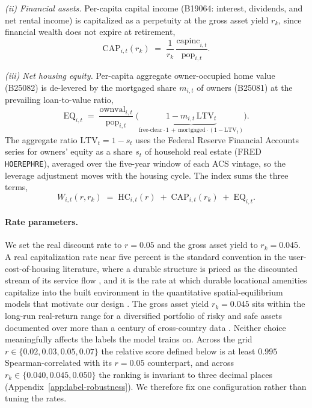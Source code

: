 \emph{(ii) Financial assets.} Per-capita capital income (B19064: interest, dividends, and net
rental income) is capitalized as a perpetuity at the gross asset yield $r_k$, since financial
wealth does not expire at retirement,
\begin{equation}
\mathrm{CAP}_{i,t}(r_k) \;=\; \frac{1}{r_k}\,\frac{\mathrm{capinc}_{i,t}}{\mathrm{pop}_{i,t}}.
\label{eq:cap}
\end{equation}

\emph{(iii) Net housing equity.} Per-capita aggregate owner-occupied home value (B25082) is
de-levered by the mortgaged share $m_{i,t}$ of owners (B25081) at the prevailing
loan-to-value ratio,
\begin{equation}
\mathrm{EQ}_{i,t} \;=\; \frac{\mathrm{ownval}_{i,t}}{\mathrm{pop}_{i,t}}
\;\big(\underbrace{1 - m_{i,t}\,\mathrm{LTV}_t}_{\text{free-clear}\cdot 1\,+\,\text{mortgaged}\cdot(1-\mathrm{LTV}_t)}\big).
\label{eq:eq}
\end{equation}
The aggregate ratio $\mathrm{LTV}_t = 1 - s_t$ uses the Federal Reserve Financial Accounts
series for owners' equity as a share $s_t$ of household real estate (FRED \texttt{HOEREPHRE}),
averaged over the five-year window of each ACS vintage, so the leverage adjustment moves with
the housing cycle. The index sums the three terms,
\begin{equation}
W_{i,t}(r,r_k) \;=\; \mathrm{HC}_{i,t}(r) \;+\; \mathrm{CAP}_{i,t}(r_k) \;+\; \mathrm{EQ}_{i,t}.
\label{eq:w2}
\end{equation}

\paragraph{Rate parameters.}
We set the real discount rate to $r=0.05$ and the gross asset yield to $r_k=0.045$. A real
capitalization rate near five percent is the standard convention in the user-cost-of-housing
literature, where a durable structure is priced as the discounted stream of its service flow
\citep{poterba1984,himmelberg2005}, and it is the rate at which durable locational amenities
capitalize into the built environment in the quantitative spatial-equilibrium models that
motivate our design \citep{ahlfeldt2015economics}. The gross asset yield $r_k=0.045$ sits
within the long-run real-return range for a diversified portfolio of risky and safe assets
documented over more than a century of cross-country data \citep{jorda2019rate}. Neither
choice meaningfully affects the labels the model trains on. Across the grid
$r\in\{0.02,0.03,0.05,0.07\}$ the relative score defined below is at least $0.995$
Spearman-correlated with its $r=0.05$ counterpart, and across $r_k\in\{0.040,0.045,0.050\}$
the ranking is invariant to three decimal places (Appendix~\ref{app:label-robustness}). We
therefore fix one configuration rather than tuning the rates.

